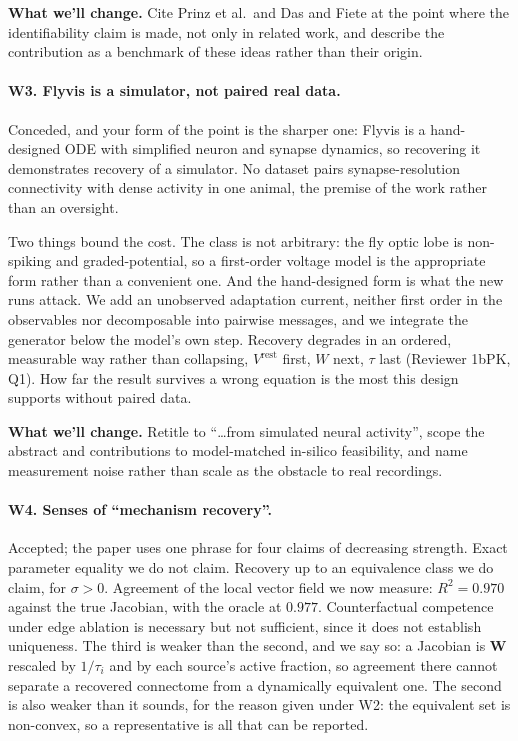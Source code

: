 \documentclass[11pt]{article}
\newcommand{\Mat}[1]{\mathbf{#1}}
\begin{document}
\textbf{What we'll change.} Cite Prinz et al.\ and Das and Fiete at the point where
the identifiability claim is made, not only in related work, and describe the
contribution as a benchmark of these ideas rather than their origin.

\paragraph{W3. Flyvis is a simulator, not paired real data.}
Conceded, and your form of the point is the sharper one: Flyvis is a
hand-designed ODE with simplified neuron and synapse dynamics, so recovering it
demonstrates recovery of a simulator. No dataset pairs synapse-resolution
connectivity with dense activity in one animal, the premise of the work rather
than an oversight.

Two things bound the cost. The class is not arbitrary: the fly optic lobe is
non-spiking and graded-potential, so a first-order voltage model is the
appropriate form rather than a convenient one. And the hand-designed form is what
the new runs attack. We add an unobserved adaptation
current, neither first order in the observables nor decomposable into pairwise
messages, and we integrate the generator below the model's own step. Recovery
degrades in an ordered, measurable way rather than collapsing,
$V^{\mathrm{rest}}$ first, $W$ next, $\tau$ last (Reviewer 1bPK, Q1). How far the
result survives a wrong equation is the most this design supports without paired
data.

\textbf{What we'll change.} Retitle to ``\dots from simulated neural activity'',
scope the abstract and contributions to model-matched in-silico feasibility, and
name measurement noise rather than scale as the obstacle to real recordings.

\paragraph{W4. Senses of ``mechanism recovery''.}
Accepted; the paper uses one phrase for four claims of decreasing strength.
Exact parameter equality we do not claim. Recovery up to an equivalence class we
do claim, for $\sigma > 0$. Agreement of the local vector field we now measure:
$R^2 = 0.970$ against the true Jacobian, with the oracle at $0.977$.
Counterfactual competence under edge ablation is necessary but not sufficient,
since it does not establish uniqueness. The third is weaker than the second, and
we say so: a Jacobian is $\Mat{W}$ rescaled by $1/\tau_i$ and by each source's
active fraction, so agreement there cannot separate a recovered connectome from a
dynamically equivalent one. The second is also weaker than it sounds, for the
reason given under W2: the equivalent set is non-convex, so a representative is
all that can be reported.
\end{document}
